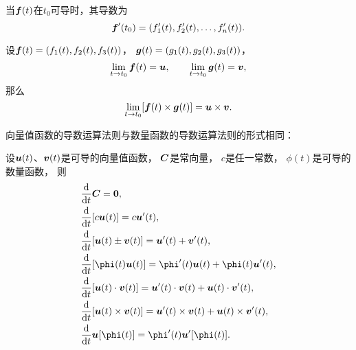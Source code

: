 \begin{theorem}
当\(\boldsymbol{f}(t)\)在\(t_0\)可导时，其导数为
\begin{equation}
	\boldsymbol{f}'(t_0)
	= (f_1'(t),f_2'(t),\dotsc,f_n'(t)).
\end{equation}
\end{theorem}

\begin{theorem}
设\(\boldsymbol{f}(t) = (f_1(t),f_2(t),f_3(t))\)，
\(\boldsymbol{g}(t) = (g_1(t),g_2(t),g_3(t))\)，
\[
	\lim_{t \to t_0} \boldsymbol{f}(t) = \boldsymbol{u},
	\qquad
	\lim_{t \to t_0} \boldsymbol{g}(t) = \boldsymbol{v},
\]
那么\[
	\lim_{t \to t_0} [\boldsymbol{f}(t) \times \boldsymbol{g}(t)]
	= \boldsymbol{u} \times \boldsymbol{v}.
\]
\end{theorem}

向量值函数的导数运算法则与数量函数的导数运算法则的形式相同：
\begin{theorem}[向量值函数的导数运算法则]
设\(\boldsymbol{u}(t)\)、\(\boldsymbol{v}(t)\)是可导的向量值函数，
\(\boldsymbol{C}\)是常向量，
\(c\)是任一常数，
\(\phi(t)\)是可导的数量函数，
则\begin{align}
	&\dv{t} \vb{C}
		= \vb{0}, \\
	&\dv{t} [c \vb{u}(t)]
		= c \vb{u}'(t), \\
	&\dv{t} [\vb{u}(t) \pm \vb{v}(t)]
		= \vb{u}'(t) + \vb{v}'(t), \\
	&\dv{t} [\phi(t) \vb{u}(t)]
		= \phi'(t) \vb{u}(t) + \phi(t) \vb{u}'(t), \\
	&\dv{t} [\vb{u}(t) \cdot \vb{v}(t)]
		= \vb{u}'(t) \cdot \vb{v}(t) + \vb{u}(t) \cdot \vb{v}'(t), \\
	&\dv{t} [\vb{u}(t) \times \vb{v}(t)]
		= \vb{u}'(t) \times \vb{v}(t) + \vb{u}(t) \times \vb{v}'(t), \\
	&\dv{t} \vb{u}[\phi(t)]
		= \phi'(t) \vb{u}'[\phi(t)].
\end{align}
\end{theorem}
